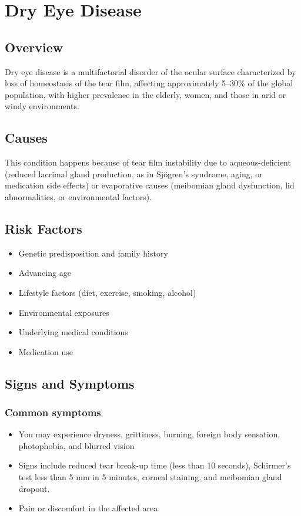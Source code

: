 \chapter{Dry Eye Disease}
\label{sec:Dry Eye Disease}

\section{Overview}
Dry eye disease is a multifactorial disorder of the ocular surface characterized by loss of homeostasis of the tear film, affecting approximately 5--30\% of the global population, with higher prevalence in the elderly, women, and those in arid or windy environments.
\section{Causes}
This condition happens because of tear film instability due to aqueous-deficient (reduced lacrimal gland production, as in Sj\"{o}gren's syndrome, aging, or medication side effects) or evaporative causes (meibomian gland dysfunction, lid abnormalities, or environmental factors).     
\section{Risk Factors}

\begin{itemize}[noitemsep]
  \item Genetic predisposition and family history
  \item Advancing age
  \item Lifestyle factors (diet, exercise, smoking, alcohol)
  \item Environmental exposures
  \item Underlying medical conditions
  \item Medication use
\end{itemize}
\section{Signs and Symptoms}

\subsection{Common symptoms}
\begin{itemize}[noitemsep]
  \item You may experience dryness, grittiness, burning, foreign body sensation, photophobia, and blurred vision
  \item Signs include reduced tear break-up time (less than 10 seconds), Schirmer's test less than 5 mm in 5 minutes, corneal staining, and meibomian gland dropout.
  \item Pain or discomfort in the affected area
  \end{itemize}

